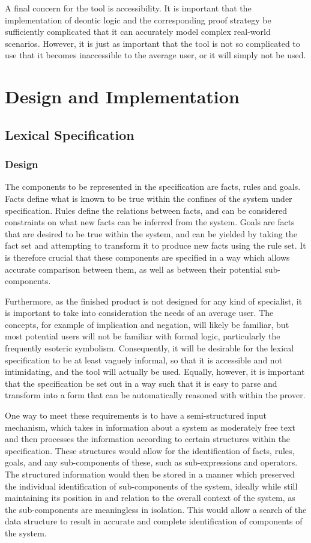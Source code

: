 \documentclass{l4proj}
\begin{document}
A final concern for the tool is accessibility. It is important that the implementation of deontic logic and the corresponding proof strategy be sufficiently complicated that it can accurately model complex real-world scenarios. However, it is just as important that the tool is not so complicated to use that it becomes inaccessible to the average user, or it will simply not be used. 

\chapter{Design and Implementation}

\section{Lexical Specification}

\subsection{Design}
The components to be represented in the specification are facts, rules and goals. Facts define what is known to be true within the confines of the system under specification. Rules define the relations between facts, and can be considered constraints on what new facts can be inferred from the system. Goals are facts that are desired to be true within the system, and can be yielded by taking the fact set and attempting to transform it to produce new facts using the rule set. It is therefore crucial that these components are specified in a way which allows accurate comparison between them, as well as between their potential sub-components. 

Furthermore, as the finished product is not designed for any kind of specialist, it is important to take into consideration the needs of an average user. The concepts, for example of implication and negation, will likely be familiar, but most potential users will not be familiar with formal logic, particularly the frequently esoteric symbolism. Consequently, it will be desirable for the lexical specification to be at least vaguely informal, so that it is accessible and not intimidating, and the tool will actually be used. Equally, however, it is important that the specification be set out in a way such that it is easy to parse and transform into a form that can be automatically reasoned with within the prover. 

One way to meet these requirements is to have a semi-structured input mechanism, which takes in information about a system as moderately free text and then processes the information according to certain structures within the specification. These structures would allow for the identification of facts, rules, goals, and any sub-components of these, such as sub-expressions and operators. The structured information would then be stored in a manner which preserved the individual identification of sub-components of the system, ideally while still maintaining its position in and relation to the overall context of the system, as the sub-components are meaningless in isolation. This would allow a search of the data structure to result in accurate and complete identification of components of the system. 
\end{document}
